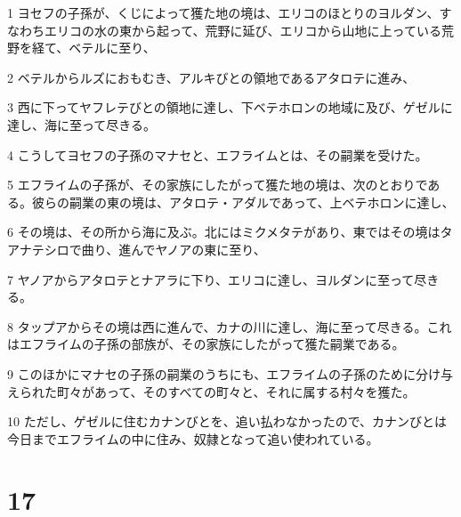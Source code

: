\par 1 ヨセフの子孫が、くじによって獲た地の境は、エリコのほとりのヨルダン、すなわちエリコの水の東から起って、荒野に延び、エリコから山地に上っている荒野を経て、ベテルに至り、
\par 2 ベテルからルズにおもむき、アルキびとの領地であるアタロテに進み、
\par 3 西に下ってヤフレテびとの領地に達し、下ベテホロンの地域に及び、ゲゼルに達し、海に至って尽きる。
\par 4 こうしてヨセフの子孫のマナセと、エフライムとは、その嗣業を受けた。
\par 5 エフライムの子孫が、その家族にしたがって獲た地の境は、次のとおりである。彼らの嗣業の東の境は、アタロテ・アダルであって、上ベテホロンに達し、
\par 6 その境は、その所から海に及ぶ。北にはミクメタテがあり、東ではその境はタアナテシロで曲り、進んでヤノアの東に至り、
\par 7 ヤノアからアタロテとナアラに下り、エリコに達し、ヨルダンに至って尽きる。
\par 8 タップアからその境は西に進んで、カナの川に達し、海に至って尽きる。これはエフライムの子孫の部族が、その家族にしたがって獲た嗣業である。
\par 9 このほかにマナセの子孫の嗣業のうちにも、エフライムの子孫のために分け与えられた町々があって、そのすべての町々と、それに属する村々を獲た。
\par 10 ただし、ゲゼルに住むカナンびとを、追い払わなかったので、カナンびとは今日までエフライムの中に住み、奴隷となって追い使われている。

\chapter{17}

